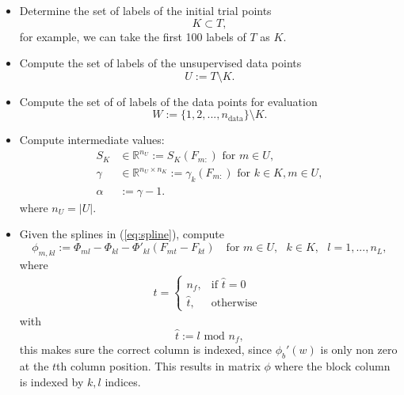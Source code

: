 \documentclass[12pt]{article}
\begin{document}
\begin{itemize}
	\item Determine the set of labels of the initial trial points
	\begin{equation}
		K \subset T,
	\end{equation}
	for example, we can take the first 100 labels of $T$ as $K$.
	\item Compute the set of labels of the unsupervised data points
	\begin{equation}
		U := T \setminus K.
	\end{equation}
	\item Compute the set of of labels of the data points for evaluation
	\begin{equation}
		W := \{1,2,...,n_\text{data}\} \setminus K.
	\end{equation}
	\item Compute intermediate values:
	\begin{equation}
		\label{eq:intermediate}
		\begin{split}
			S_K &\in \mathbb{R}^{n_U} := S_K(F_{m:}) \text{ for } m \in U,\\
			\gamma &\in \mathbb{R}^{n_U \times n_K} := \gamma_k(F_{m:}) \text{ for } k \in K, m \in U, \\
			\alpha &:= \gamma - 1.
		\end{split}
	\end{equation}
	where $n_U = |U|.$
	\item Given the splines in (\ref{eq:spline}), compute
	\begin{equation} %
		\phi_{m, kl} := \Phi_{ml} - \Phi_{kl} - \Phi'_{kl}(F_{mt}-F_{kt}) \quad \text{for } m \in U, \text{ }k \in K, \text{ }l = 1,...,n_L,
	\end{equation}
	where
	\begin{equation}
		\begin{split}
			t = 
			\begin{cases}
				n_f,  & \text{if } \hat{t} = 0 \\
				\hat{t}, & \text{otherwise}
			\end{cases}
			~~ 
		\end{split}
	\end{equation}
	with
	\begin{equation}
		\hat{t} := l \text{ mod } n_f,
	\end{equation}
	this makes sure the correct column is indexed, since $\phi_b'(w)$ is only non zero at the $t$th column position. This results in matrix $\phi$ where the block column is indexed by $k,l$ indices.
\end{itemize}
\end{document}
